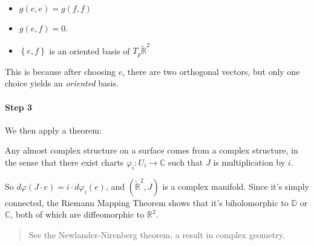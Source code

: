 \begin{itemize}
\tightlist
\item
  \(g(e, e) = g(f, f)\)
\item
  \(g(e, f) = 0\).
\item
  \(\left\{{e, f}\right\}\) is an oriented basis of
  \(T_p \tilde {\mathbb{R}}^2\)
\end{itemize}

This is because after choosing \(e\), there are two orthogonal vectors,
but only one choice yields an \emph{oriented} basis.

\begin{figure}
\centering
{}
\end{figure}

\hypertarget{step-3}{%
\paragraph{Step 3}\label{step-3}}

We then apply a theorem:

\begin{theorem}[?]

Any almost complex structure on a surface comes from a complex
structure, in the sense that there exist charts
\(\varphi_i: U_i \to {\mathbb{C}}\) such that \(J\) is multiplication by
\(i\).

\end{theorem}

So \(d \varphi(J \cdot e) = i \cdot d \varphi_i (e)\), and
\((\tilde {\mathbb{R}}^2, J)\) is a complex manifold. Since it's simply
connected, the Riemann Mapping Theorem shows that it's biholomorphic to
\({\mathbb{D}}\) or \({\mathbb{C}}\), both of which are diffeomorphic to
\({\mathbb{R}}^2\).

\begin{quote}
See the Newlander-Nirenberg theorem, a result in complex geometry.
\end{quote}

\cleardoublepage

\renewcommand{\listtheoremname}{}
\listoftheorems[ignoreall,show={definition}, numwidth=3.5em]
\cleardoublepage

\renewcommand{\listtheoremname}{}
\listoftheorems[ignoreall,show={theorem,proposition}, numwidth=3.5em]
\cleardoublepage

\renewcommand{\listtheoremname}{}
\listoftheorems[ignoreall,show={exercise}, numwidth=3.5em]
\cleardoublepage

\listoffigures
\cleardoublepage


\printbibliography[title=Bibliography]



